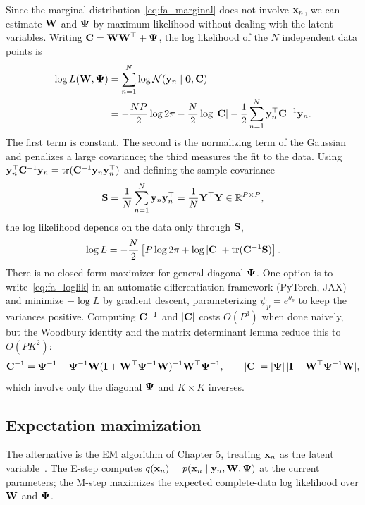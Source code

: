 Since the marginal distribution~\eqref{eq:fa_marginal} does not involve $\mathbf{x}_n$, we can estimate $\mathbf{W}$ and $\boldsymbol{\Psi}$ by maximum likelihood without dealing with the latent variables. Writing $\mathbf{C}=\mathbf{W}\mathbf{W}^\top+\boldsymbol{\Psi}$, the log likelihood of the $N$ independent data points is
\begin{align}
  \log L(\mathbf{W},\boldsymbol{\Psi}) &= \sum_{n=1}^N\log\mathcal{N}(\mathbf{y}_n\mid\mathbf{0},\mathbf{C}) \nonumber\\
  &= -\frac{NP}{2}\log 2\pi-\frac{N}{2}\log|\mathbf{C}|-\frac12\sum_{n=1}^N\mathbf{y}_n^\top\mathbf{C}^{-1}\mathbf{y}_n.
  \label{eq:fa_loglik}
\end{align}
The first term is constant. The second is the normalizing term of the Gaussian and penalizes a large covariance; the third measures the fit to the data. Using $\mathbf{y}_n^\top\mathbf{C}^{-1}\mathbf{y}_n=\operatorname{tr}(\mathbf{C}^{-1}\mathbf{y}_n\mathbf{y}_n^\top)$ and defining the sample covariance
\begin{equation}
  \mathbf{S}=\frac1N\sum_{n=1}^N\mathbf{y}_n\mathbf{y}_n^\top=\frac1N\mathbf{Y}^\top\mathbf{Y} \in\mathbb{R}^{P\times P},
  \label{eq:S}
\end{equation}
the log likelihood depends on the data only through $\mathbf{S}$,
\begin{equation}
  \log L = -\frac N2\left[P\log2\pi+\log|\mathbf{C}|+\operatorname{tr}(\mathbf{C}^{-1}\mathbf{S})\right].
  \label{eq:fa_loglik_S}
\end{equation}
There is no closed-form maximizer for general diagonal $\boldsymbol{\Psi}$. One option is to write~\eqref{eq:fa_loglik} in an automatic differentiation framework (PyTorch, JAX) and minimize $-\log L$ by gradient descent, parameterizing $\psi_p=e^{\theta_p}$ to keep the variances positive. Computing $\mathbf{C}^{-1}$ and $|\mathbf{C}|$ costs $O(P^3)$ when done naively, but the Woodbury identity and the matrix determinant lemma reduce this to $O(PK^2)$:
\begin{equation}
  \mathbf{C}^{-1}=\boldsymbol{\Psi}^{-1}-\boldsymbol{\Psi}^{-1}\mathbf{W}(\mathbf{I}+\mathbf{W}^\top\boldsymbol{\Psi}^{-1}\mathbf{W})^{-1}\mathbf{W}^\top\boldsymbol{\Psi}^{-1}, \qquad
  |\mathbf{C}| = |\boldsymbol{\Psi}|\,|\mathbf{I}+\mathbf{W}^\top\boldsymbol{\Psi}^{-1}\mathbf{W}|,
\end{equation}
which involve only the diagonal $\boldsymbol{\Psi}$ and $K\times K$ inverses.

\subsection{Expectation maximization}

The alternative is the EM algorithm of Chapter 5, treating $\mathbf{x}_n$ as the latent variable~\citep{rubin1982,ghahramani1996}. The E-step computes $q(\mathbf{x}_n)=p(\mathbf{x}_n\mid\mathbf{y}_n,\mathbf{W},\boldsymbol{\Psi})$ at the current parameters; the M-step maximizes the expected complete-data log likelihood over $\mathbf{W}$ and $\boldsymbol{\Psi}$.

